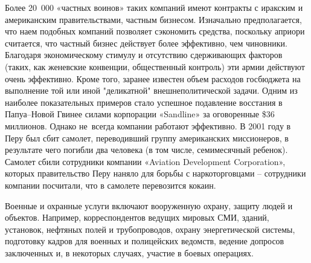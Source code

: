 \documentclass[a4paper,12pt,fleqn]{article} %
\begin{document}
Более 20 000 «частных воинов» таких компаний имеют контракты с иракским и американским правительствами, частным бизнесом. Изначально предполагается, что наем подобных компаний позволяет сэкономить средства, поскольку априори считается, что частный бизнес действует более эффективно, чем чиновники. Благодаря экономическому стимулу и отсутствию сдерживающих факторов (таких, как женевские конвенции, общественный контроль) эти армии действуют очень эффективно. Кроме того, заранее известен объем расходов госбюджета на выполнение той или иной "деликатной" внешнеполитической задачи. Одним из наиболее показательных примеров стало успешное подавление восстания в Папуа–Новой Гвинее силами корпорации «Sandline» за оговоренные \$36 миллионов. Однако не~всегда компании работают эффективно. В 2001 году в Перу был сбит самолет, переводивший группу американских миссионеров, в результате чего погибли два человека (в том числе, семимесячный ребенок). Самолет сбили сотрудники компании «Aviation Development Corporation», которых правительство Перу наняло для борьбы с наркоторговцами – сотрудники компании посчитали, что в самолете перевозится кокаин. \\


Военные и охранные услуги включают вооруженную охрану, защиту людей и объектов. Например,  корреспондентов ведущих мировых СМИ, зданий, установок, нефтяных полей и трубопроводов, охрану энергетической системы, подготовку кадров для военных и полицейских ведомств, ведение допросов заключенных и, в некоторых случаях, участие в боевых операциях.\\
\end{document}
